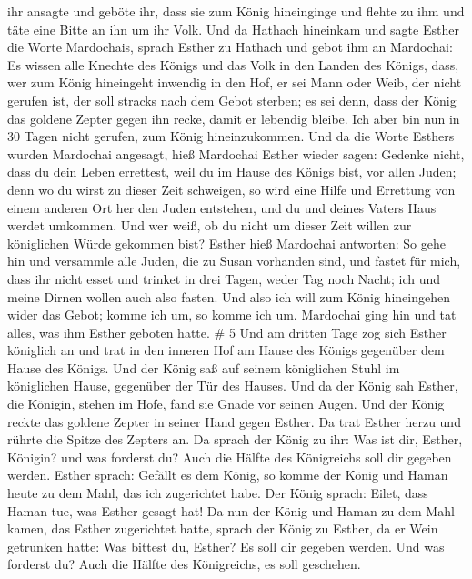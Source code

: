 ihr ansagte und geböte ihr, dass sie zum König hineinginge und flehte zu
ihm und täte eine Bitte an ihn um ihr Volk.  Und da Hathach
hineinkam und sagte Esther die Worte Mardochais,  sprach
Esther zu Hathach und gebot ihm an Mardochai:  Es wissen
alle Knechte des Königs und das Volk in den Landen des Königs, dass, wer
zum König hineingeht inwendig in den Hof, er sei Mann oder Weib, der
nicht gerufen ist, der soll stracks nach dem Gebot sterben; es sei denn,
dass der König das goldene Zepter gegen ihn recke, damit er lebendig
bleibe. Ich aber bin nun in 30 Tagen nicht gerufen, zum König
hineinzukommen.  Und da die Worte Esthers wurden Mardochai
angesagt,  hieß Mardochai Esther wieder sagen: Gedenke
nicht, dass du dein Leben errettest, weil du im Hause des Königs bist,
vor allen Juden;  denn wo du wirst zu dieser Zeit
schweigen, so wird eine Hilfe und Errettung von einem anderen Ort her
den Juden entstehen, und du und deines Vaters Haus werdet umkommen. Und
wer weiß, ob du nicht um dieser Zeit willen zur königlichen Würde
gekommen bist?  Esther hieß Mardochai antworten:
 So gehe hin und versammle alle Juden, die zu Susan
vorhanden sind, und fastet für mich, dass ihr nicht esset und trinket in
drei Tagen, weder Tag noch Nacht; ich und meine Dirnen wollen auch also
fasten. Und also ich will zum König hineingehen wider das Gebot; komme
ich um, so komme ich um.  Mardochai ging hin und tat alles,
was ihm Esther geboten hatte. \# 5  Und am dritten Tage zog
sich Esther königlich an und trat in den inneren Hof am Hause des Königs
gegenüber dem Hause des Königs. Und der König saß auf seinem königlichen
Stuhl im königlichen Hause, gegenüber der Tür des Hauses. 
Und da der König sah Esther, die Königin, stehen im Hofe, fand sie Gnade
vor seinen Augen. Und der König reckte das goldene Zepter in seiner Hand
gegen Esther. Da trat Esther herzu und rührte die Spitze des Zepters an.
 Da sprach der König zu ihr: Was ist dir, Esther, Königin?
und was forderst du? Auch die Hälfte des Königreichs soll dir gegeben
werden.  Esther sprach: Gefällt es dem König, so komme der
König und Haman heute zu dem Mahl, das ich zugerichtet habe.
 Der König sprach: Eilet, dass Haman tue, was Esther gesagt
hat! Da nun der König und Haman zu dem Mahl kamen, das Esther
zugerichtet hatte,  sprach der König zu Esther, da er Wein
getrunken hatte: Was bittest du, Esther? Es soll dir gegeben werden. Und
was forderst du? Auch die Hälfte des Königreichs, es soll geschehen.

